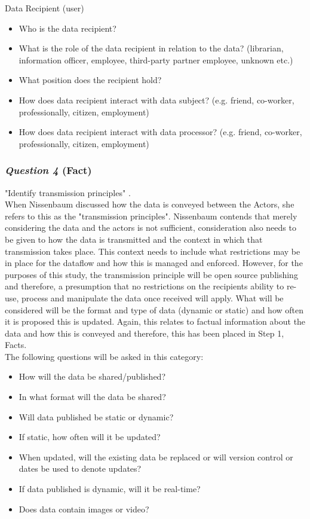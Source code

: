 Data Recipient (user)
\begin{itemize}
\item Who is the data recipient?
\item What is the role of the data recipient in relation to the data? (librarian, information officer, employee, third-party partner employee, unknown etc.)
\item What position does the recipient hold?
\item How does data recipient interact with data subject? (e.g. friend, co-worker, professionally, citizen, employment)
\item How does data recipient interact with data processor? (e.g. friend, co-worker, professionally, citizen, employment) 
\end{itemize}

\subsubsection {{\it Question 4} {\bf (Fact)}}
"Identify transmission principles" \cite{Nissenbaum_2010}.\\

When Nissenbaum discussed how the data is conveyed between the Actors, she refers to this as the "transmission principles". Nissenbaum contends that merely considering the data and the actors is not sufficient, consideration also needs to be given to how the data is transmitted and the context in which that transmission takes place. This context needs to include what restrictions may be in place for the dataflow and how this is managed and enforced. However, for the purposes of this study, the transmission principle will be open source publishing and therefore, a presumption that no restrictions on the recipients ability to re-use, process and manipulate the data once received will apply. What will be considered will be the format and type of data (dynamic or static) and how often it is proposed this is updated. Again, this relates to factual information about the data and how this is conveyed and therefore, this has been placed in Step 1, Facts. \\
The following questions will be asked in this category:
\begin{itemize}
\item How will the data be shared/published?
\item In what format will the data be shared?
\item Will data published be static or dynamic?
\item If static, how often will it be updated?
\item When updated, will the existing data be replaced or will version control or dates be used to denote updates?
\item If data published is dynamic, will it be real-time?
\item Does data contain images or video?
\end{itemize}
